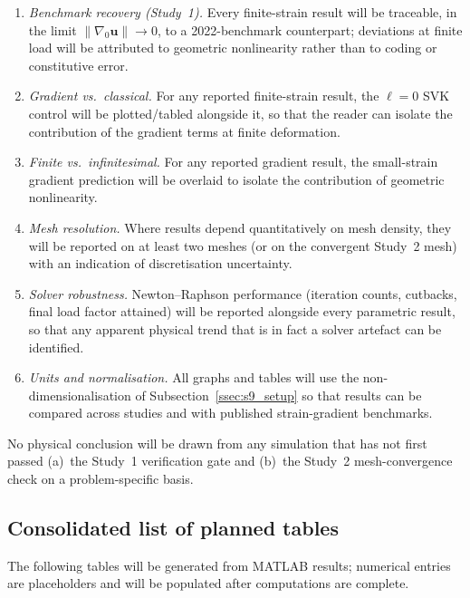 \documentclass[11pt]{article}
\newcommand{\gradz}{\nabla_{0}}
\newcommand{\gradz}{\nabla_{0}}
\begin{document}
\begin{enumerate}
  \item \emph{Benchmark recovery (Study~1).}  Every
    finite-strain result will be traceable, in the limit
    $\|\gradz\mathbf{u}\|\to 0$, to a 2022-benchmark
    counterpart; deviations at finite load will be attributed
    to geometric nonlinearity rather than to coding or
    constitutive error.
  \item \emph{Gradient vs.\ classical.}  For any reported
    finite-strain result, the $\ell=0$ SVK control will be
    plotted/tabled alongside it, so that the reader can
    isolate the contribution of the gradient terms at
    finite deformation.
  \item \emph{Finite vs.\ infinitesimal.}  For any reported
    gradient result, the small-strain gradient prediction
    will be overlaid to isolate the contribution of
    geometric nonlinearity.
  \item \emph{Mesh resolution.}  Where results depend
    quantitatively on mesh density, they will be reported on
    at least two meshes (or on the convergent Study~2 mesh)
    with an indication of discretisation uncertainty.
  \item \emph{Solver robustness.}  Newton--Raphson performance
    (iteration counts, cutbacks, final load factor attained)
    will be reported alongside every parametric result, so
    that any apparent physical trend that is in fact a
    solver artefact can be identified.
  \item \emph{Units and normalisation.}  All graphs and
    tables will use the non-dimensionalisation of
    Subsection~\ref{ssec:s9_setup} so that results can be
    compared across studies and with published
    strain-gradient benchmarks.
\end{enumerate}

No physical conclusion will be drawn from any simulation that
has not first passed (a)~the Study~1 verification gate and
(b)~the Study~2 mesh-convergence check on a problem-specific
basis.

\subsection{Consolidated list of planned tables}
\label{ssec:s9_tables}

The following tables will be generated from MATLAB results;
numerical entries are placeholders and will be populated after
computations are complete.
\end{document}
